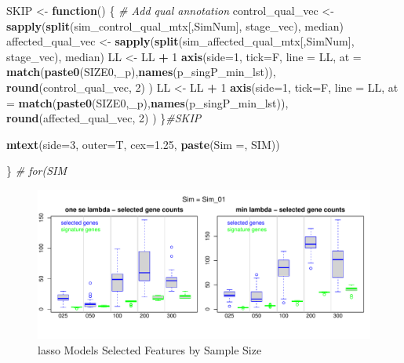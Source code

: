 \documentclass[
]{book}
\newenvironment{Shaded}{\begin{snugshade}}{\end{snugshade}}
\newcommand{\CommentTok}[1]{\textcolor[rgb]{0.56,0.35,0.01}{\textit{#1}}}
\newcommand{\ControlFlowTok}[1]{\textcolor[rgb]{0.13,0.29,0.53}{\textbf{#1}}}
\newcommand{\DataTypeTok}[1]{\textcolor[rgb]{0.13,0.29,0.53}{#1}}
\newcommand{\DecValTok}[1]{\textcolor[rgb]{0.00,0.00,0.81}{#1}}
\newcommand{\FloatTok}[1]{\textcolor[rgb]{0.00,0.00,0.81}{#1}}
\newcommand{\KeywordTok}[1]{\textcolor[rgb]{0.13,0.29,0.53}{\textbf{#1}}}
\newcommand{\NormalTok}[1]{#1}
\newcommand{\OperatorTok}[1]{\textcolor[rgb]{0.81,0.36,0.00}{\textbf{#1}}}
\newcommand{\StringTok}[1]{\textcolor[rgb]{0.31,0.60,0.02}{#1}}
\begin{document}
\begin{Shaded}
\begin{Highlighting}[]
\NormalTok{SKIP  <{-}}\StringTok{ }\ControlFlowTok{function}\NormalTok{() \{}
\CommentTok{\# Add qual annotation}
\NormalTok{control\_qual\_vec <{-}}\StringTok{ }\KeywordTok{sapply}\NormalTok{(}\KeywordTok{split}\NormalTok{(sim\_control\_qual\_mtx[,SimNum], stage\_vec), median)}
\NormalTok{affected\_qual\_vec <{-}}\StringTok{ }\KeywordTok{sapply}\NormalTok{(}\KeywordTok{split}\NormalTok{(sim\_affected\_qual\_mtx[,SimNum], stage\_vec), median)}
\NormalTok{LL <{-}}\StringTok{ }\NormalTok{LL }\OperatorTok{+}\StringTok{ }\DecValTok{1}
\KeywordTok{axis}\NormalTok{(}\DataTypeTok{side=}\DecValTok{1}\NormalTok{, }\DataTypeTok{tick=}\NormalTok{F, }\DataTypeTok{line =}\NormalTok{ LL,}
  \DataTypeTok{at =}  \KeywordTok{match}\NormalTok{(}\KeywordTok{paste0}\NormalTok{(SIZE0,}\StringTok{\textquotesingle{}\_p\textquotesingle{}}\NormalTok{),}\KeywordTok{names}\NormalTok{(p\_singP\_min\_lst)),}
  \KeywordTok{round}\NormalTok{(control\_qual\_vec, }\DecValTok{2}\NormalTok{)}
\NormalTok{ )}
\NormalTok{LL <{-}}\StringTok{ }\NormalTok{LL }\OperatorTok{+}\StringTok{ }\DecValTok{1}
\KeywordTok{axis}\NormalTok{(}\DataTypeTok{side=}\DecValTok{1}\NormalTok{, }\DataTypeTok{tick=}\NormalTok{F, }\DataTypeTok{line =}\NormalTok{ LL,}
  \DataTypeTok{at =}  \KeywordTok{match}\NormalTok{(}\KeywordTok{paste0}\NormalTok{(SIZE0,}\StringTok{\textquotesingle{}\_p\textquotesingle{}}\NormalTok{),}\KeywordTok{names}\NormalTok{(p\_singP\_min\_lst)),}
  \KeywordTok{round}\NormalTok{(affected\_qual\_vec, }\DecValTok{2}\NormalTok{)}
\NormalTok{ )}
\NormalTok{\}}\CommentTok{\#SKIP}

\KeywordTok{mtext}\NormalTok{(}\DataTypeTok{side=}\DecValTok{3}\NormalTok{, }\DataTypeTok{outer=}\NormalTok{T, }\DataTypeTok{cex=}\FloatTok{1.25}\NormalTok{, }\KeywordTok{paste}\NormalTok{(}\StringTok{\textquotesingle{}Sim =\textquotesingle{}}\NormalTok{,  SIM))}

\NormalTok{\} }\CommentTok{\# for(SIM}
\end{Highlighting}
\end{Shaded}

\begin{figure}
\centering
\includegraphics{Static/figures/lasso-simRes-features-bySim-1.pdf}
\caption{\label{fig:lasso-simRes-features-bySim}lasso Models Selected Features by Sample Size}
\end{figure}
\end{document}
